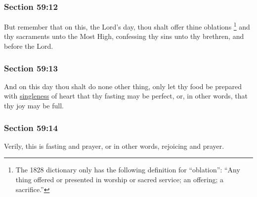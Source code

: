 	\subsubsection{Section 59:12} %
		\label{DC59-12}

		But remember that on this, the Lord's day, thou shalt offer thine oblations%
			\footnote{%
				The 1828 dictionary only has the following definition for ``oblation'': ``Any thing offered or presented in worship or sacred service; an offering; a sacrifice.''
				}
		and thy sacraments unto the Most High, confessing thy sins unto thy brethren, and before the Lord.


	\subsubsection{Section 59:13} %
		\label{DC59-13}

		And on this day thou shalt do none other thing, only let thy food be prepared with \hyperref[SINGLE]{singleness} of heart that thy fasting may be perfect, or, in other words, that thy joy may be full.


	\subsubsection{Section 59:14} %
		\label{DC59-14}

		Verily, this is fasting and prayer, or in other words, rejoicing and prayer.


